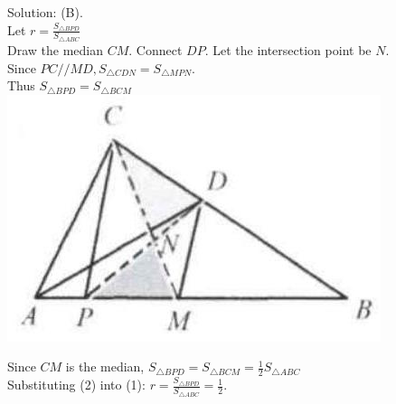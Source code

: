 \documentclass{article}
\begin{document}
Solution: (B).\\
Let \(r=\frac{S_{\triangle B P D}}{S_{\triangle A B C}}\)\\
Draw the median \(C M\). Connect \(D P\). Let the intersection point be \(N\).\\
Since \(P C / / M D, S_{\triangle C D N}=S_{\triangle M P N}\).\\
Thus \(S_{\triangle B P D}=S_{\triangle B C M}\)\\
\centering
\includegraphics[width=\textwidth]{images/reasoning_image_1.jpg}

Since \(C M\) is the median, \(S_{\triangle B P D}=S_{\triangle B C M}=\frac{1}{2} S_{\triangle A B C}\)\\
Substituting (2) into (1): \(r=\frac{S_{\triangle B P D}}{S_{\triangle A B C}}=\frac{1}{2}\).
\end{document}
